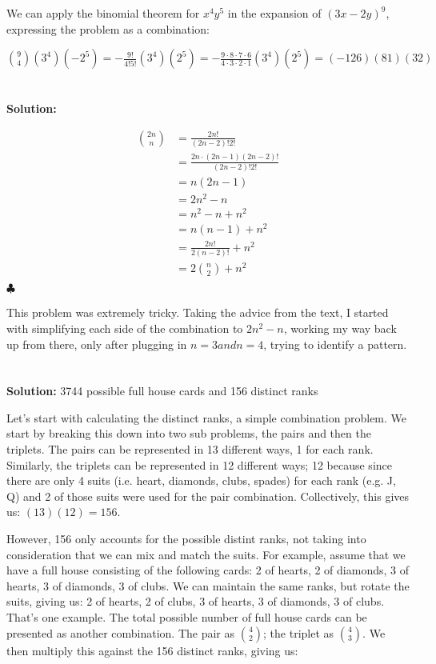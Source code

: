 \documentclass{article}
\begin{document}
We can apply the binomial theorem for $x^4y^5$ in the expansion of $(3x-2y)^9$, expressing the problem as a combination:

$\binom{9}{4}(3^4)(-2^5) = -\frac{9!}{4!5!}(3^4)(2^5) = -\frac{9\cdot8\cdot7\cdot6}{4\cdot3\cdot2\cdot1}(3^4)(2^5) = (-126)(81)(32)$

\section{}

\textbf{Solution: }

\begin{align*}
   \binom{2n}{n} &= \frac{2n!}{(2n-2)!2!} \\
                 &= \frac{2n \cdot (2n-1)(2n-2)!}{(2n-2)!2!} \\
                 &= n(2n-1) \\
                 &= 2n^2 - n \\
                 &= n^2 -n + n^2 \\
                 &= n(n-1) + n^2 \\
                 &= \frac{2n!}{2(n-2)!} + n^2 \\
                 &= 2\binom{n}{2} + n^2 \\
\end{align*}
$\clubsuit$

This problem was extremely tricky. Taking the advice from the text, I started with simplifying each side of the combination to $2n^2 - n$, working my way back up from there, only after plugging in $n=3 and n=4$, trying to identify a pattern.

\section{}

\textbf{Solution: } 3744 possible full house cards and 156 distinct ranks

Let's start with calculating the distinct ranks, a simple combination problem.  We start by breaking this down into two sub problems, the pairs and then the triplets. The pairs can be represented in 13 different ways, 1 for each rank. Similarly, the triplets can be represented in 12 different ways; 12 because since there are only 4 suits (i.e. heart, diamonds, clubs, spades) for each rank (e.g. J, Q) and 2 of those suits were used for the pair combination. Collectively, this gives us: $(13)(12) = 156$.

However, 156 only accounts for the possible distint ranks, not taking into consideration that we can mix and match the suits. For example, assume that we have a full house consisting of the following cards: 2 of hearts, 2 of diamonds, 3 of hearts, 3 of diamonds, 3 of clubs. We can maintain the same ranks, but rotate the suits, giving us: 2 of hearts, 2 of clubs, 3 of hearts, 3 of diamonds, 3 of clubs. That's one example. The total possible number of full house cards can be presented as another combination. The pair as $\binom{4}{2}$; the triplet as $\binom{4}{3}$. We then multiply this against the 156 distinct ranks, giving us:
\end{document}
